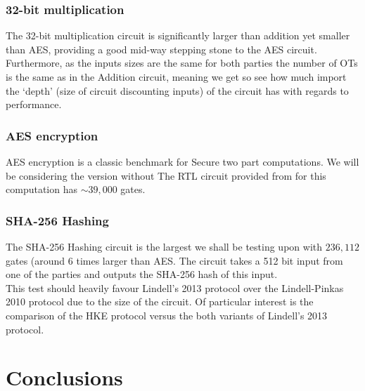 \documentclass[ %
                    author={Nicholas Tutte},
                supervisor={Prof. Nigel Smart},
                    degree={MEng},
                     title={Secure Two Party Computation},
                  subtitle={A practical comparison of recent protocols},
                      type={Research - GG1K},
                      year={2015} ]{dissertation}
\begin{document}
			\subsection{32-bit multiplication}

				The 32-bit multiplication circuit is significantly larger than addition yet smaller than AES, providing a good mid-way stepping stone to the AES circuit. Furthermore, as the inputs sizes are the same for both parties the number of OTs is the same as in the Addition circuit, meaning we get so see how much import the `depth' (size of circuit discounting inputs) of the circuit has with regards to performance.

			\subsection{AES encryption}

				AES encryption is a classic benchmark for Secure two part computations. We will be considering the version without The RTL circuit provided from \cite{NigelCircuits} for this computation has $\sim 39,000$ gates.

			\subsection{SHA-256 Hashing}

				The SHA-256 Hashing circuit is the largest we shall be testing upon with $236,112$ gates (around 6 times larger than AES. The circuit takes a 512 bit input from one of the parties and outputs the SHA-256 hash of this input.\\

				This test should heavily favour Lindell's 2013 protocol over the Lindell-Pinkas 2010 protocol due to the size of the circuit. Of particular interest is the comparison of the HKE protocol versus the both variants of Lindell's 2013 protocol.\\

				


	\chapter{Conclusions}

		
\end{document}
